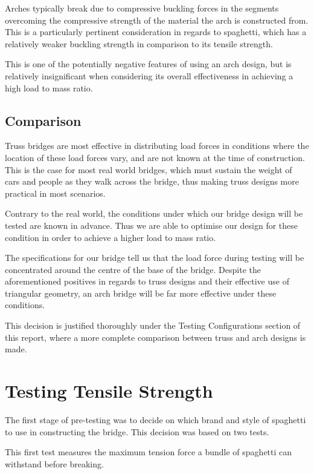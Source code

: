 \documentclass[a4paper,11pt]{article}
\begin{document}
Arches typically break due to compressive buckling forces in the segments
overcoming the compressive strength of the material the arch is constructed
from.
This is a particularly pertinent consideration in regards to spaghetti, which
has a relatively weaker buckling strength in comparison to its tensile strength.

This is one of the potentially negative features of using an arch design, but
is relatively insignificant when considering its overall effectiveness in
achieving a high load to mass ratio.


\subsection{Comparison}

Truss bridges are most effective in distributing load forces in conditions where
the location of these load forces vary, and are not known at the time of
construction.
This is the case for most real world bridges, which must sustain the weight of
cars and people as they walk across the bridge, thus making truss designs more
practical in most scenarios.

Contrary to the real world, the conditions under which our bridge design will be
tested are known in advance.
Thus we are able to optimise our design for these condition in order to achieve
a higher load to mass ratio.

The specifications for our bridge tell us that the load force during testing will
be concentrated around the centre of the base of the bridge.
Despite the aforementioned positives in regards to truss designs and their
effective use of triangular geometry, an arch bridge will be far more
effective under these conditions.

This decision is justified thoroughly under the Testing Configurations section
of this report, where a more complete comparison between truss and arch designs
is made.





\section{Testing Tensile Strength}

The first stage of pre-testing was to decide on which brand and style of
spaghetti to use in constructing the bridge.
This decision was based on two tests.

This first test measures the maximum tension force a bundle of spaghetti can
withstand before breaking.
\end{document}
